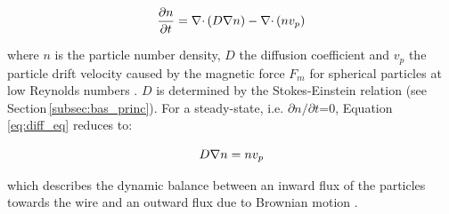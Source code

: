\begin{equation}
\label{eq:diff_eq}
\centering
\frac{\partial n}{\partial t} = \nabla\cdotp(D\nabla n)-\nabla\cdotp(n v_{p})
\end{equation}

where $n$ is the particle number density, $D$ the diffusion coefficient and $v_{p}$ the particle drift velocity caused by the magnetic force $F_{m}$ for spherical particles at low Reynolds numbers \cite{fletcher1991fine,FranzrebHabil}. $D$ is determined by the Stokes-Einstein relation (see Section\,\ref{subsec:bas_princ}). For a steady-state, i.e. ${\partial n}/{\partial t}$=0, Equation\,\ref{eq:diff_eq} reduces to:

\begin{equation}
\label{eq:diff_eq_2}
\centering
 D\nabla n = n v_{p}
\end{equation}

which describes the dynamic balance between an inward flux of the particles towards the wire and an outward flux due to Brownian motion \cite{fletcher1991fine}. 



% 


% 
% 
% 

